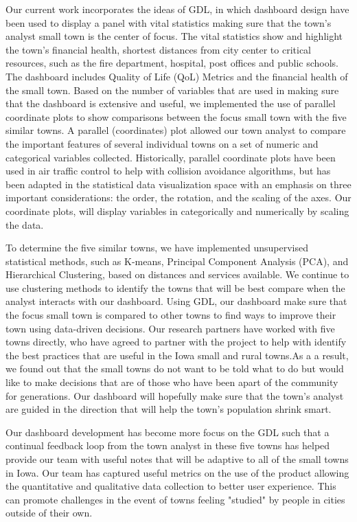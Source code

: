 \documentclass[10pt]{article}\usepackage[]{graphicx}\usepackage[]{color}
\begin{document}
Our current work incorporates the ideas of GDL, in which dashboard design have been used to display a panel with vital statistics making sure that the town's analyst small town is the center of focus. The vital statistics show and highlight the town's financial health, shortest distances from city center to critical resources, such as the fire department, hospital, post offices and public schools. The dashboard includes Quality of Life (QoL) Metrics and the financial health of the small town. Based on the number of variables that are used in making sure that the dashboard is extensive and useful, we implemented the use of parallel coordinate plots to show comparisons between the focus small town with the five similar towns. A parallel (coordinates) plot allowed our town analyst to compare the important features of several individual towns on a set of numeric and categorical variables collected. Historically, parallel coordinate plots have been used in air traffic control to help with collision avoidance algorithms, but has been adapted in the statistical data visualization space with an emphasis on three important considerations: the order, the rotation, and the scaling of the axes. Our coordinate plots, will display variables in categorically and numerically by scaling the data.





To determine the five similar towns, we have implemented unsupervised statistical methods, such as K-means, Principal Component Analysis (PCA), and Hierarchical Clustering, based on distances and services available. We continue to use clustering methods to identify the towns that will be best compare when the analyst interacts with our dashboard. Using GDL, our dashboard make sure that the focus small town is compared to other towns to find ways to improve their town using data-driven decisions. Our research partners have worked with five towns directly, who have agreed to partner with the project to help with identify the best practices that are useful in the Iowa small and rural towns.As a a result, we found out that the small towns do not want to be told what to do but would like to make decisions that are of those who have been apart of the community for generations. Our dashboard will hopefully make sure that the town's analyst are guided in the direction that will help the town's population shrink smart. 

Our dashboard development has become more focus on the GDL such that a continual feedback loop from the town analyst in these five towns has helped provide our team with useful notes that will be adaptive to all of the small towns in Iowa. Our team has captured useful metrics on the use of the product allowing the quantitative and qualitative data collection to better user experience. This can promote challenges in the event of towns feeling "studied" by people in cities outside of their own. 
\end{document}
